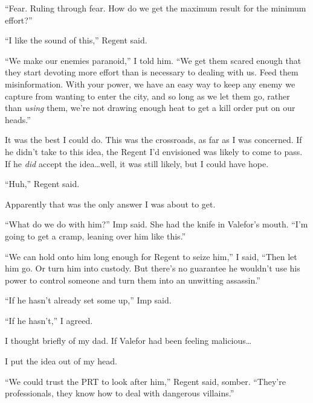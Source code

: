 ``Fear.  Ruling through fear.  How do we get the maximum result for the minimum effort?''



``I like the sound of this,'' Regent said.



``We make our enemies paranoid,'' I told him.  ``We get them scared enough that they start devoting more effort than is necessary to dealing with us.  Feed them misinformation.  With your power, we have an easy way to keep any enemy we capture from wanting to enter the city, and so long as we let them go, rather than \emph{using} them, we're not drawing enough heat to get a kill order put on our heads.''



It was the best I could do.  This was the crossroads, as far as I was concerned.  If he didn't take to this idea, the Regent I'd envisioned was likely to come to pass.  If he \emph{did }accept the idea\ldots well, it was still likely, but I could have hope.



``Huh,'' Regent said.



Apparently that was the only answer I was about to get.



``What do we do with him?'' Imp said.  She had the knife in Valefor's mouth.  ``I'm going to get a cramp, leaning over him like this.''



``We can hold onto him long enough for Regent to seize him,'' I said, ``Then let him go.  Or turn him into custody.  But there's no guarantee he wouldn't use his power to control someone and turn them into an unwitting assassin.''



``If he hasn't already set some up,'' Imp said.



``If he hasn't,'' I agreed.



I thought briefly of my dad.  If Valefor had been feeling malicious\ldots



I put the idea out of my head.



``We could trust the PRT to look after him,'' Regent said, somber.  ``They're professionals, they know how to deal with dangerous villains.''



